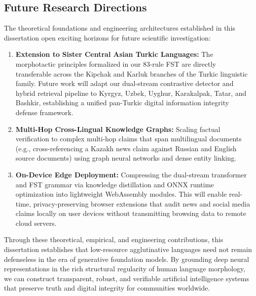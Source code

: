 \subsection{Future Research Directions}
The theoretical foundations and engineering architectures established in this dissertation open exciting horizons for future scientific investigation:
\begin{enumerate}
    \item \textbf{Extension to Sister Central Asian Turkic Languages:} The morphotactic principles formalized in our 83-rule FST are directly transferable across the Kipchak and Karluk branches of the Turkic linguistic family. Future work will adapt our dual-stream contrastive detector and hybrid retrieval pipeline to Kyrgyz, Uzbek, Uyghur, Karakalpak, Tatar, and Bashkir, establishing a unified pan-Turkic digital information integrity defense framework.
    \item \textbf{Multi-Hop Cross-Lingual Knowledge Graphs:} Scaling factual verification to complex multi-hop claims that span multilingual documents (e.g., cross-referencing a Kazakh news claim against Russian and English source documents) using graph neural networks and dense entity linking.
    \item \textbf{On-Device Edge Deployment:} Compressing the dual-stream transformer and FST grammar via knowledge distillation and ONNX runtime optimization into lightweight WebAssembly modules. This will enable real-time, privacy-preserving browser extensions that audit news and social media claims locally on user devices without transmitting browsing data to remote cloud servers.
\end{enumerate}

Through these theoretical, empirical, and engineering contributions, this dissertation establishes that low-resource agglutinative languages need not remain defenseless in the era of generative foundation models. By grounding deep neural representations in the rich structural regularity of human language morphology, we can construct transparent, robust, and verifiable artificial intelligence systems that preserve truth and digital integrity for communities worldwide.
